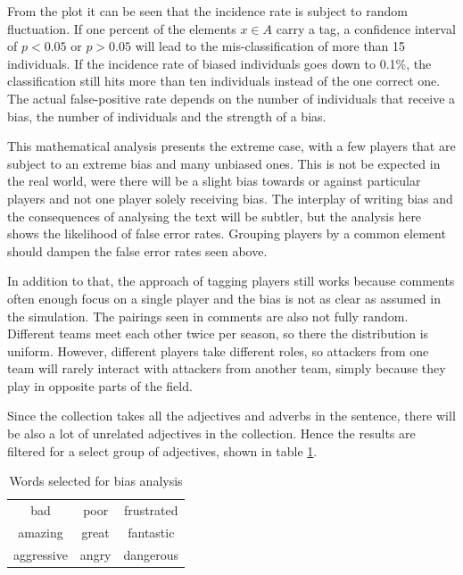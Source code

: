 \documentclass[10pt, a4paper]{UUThesisTemplate}
\begin{document}
From the plot it can be seen that the incidence rate is subject to random fluctuation. If one percent of the elements $x\in A$ carry a tag, a confidence interval of $p<0.05$ or $p>0.05$ will lead to the mis-classification of more than 15 individuals. If the incidence rate of biased individuals goes down to 0.1\%, the classification still hits more than ten individuals instead of the one correct one. The actual false-positive rate depends on the number of individuals that receive a bias, the number of individuals and the strength of a bias.

This mathematical analysis presents the extreme case, with a few players that are subject to an extreme bias and many unbiased ones. This is not be expected in the real world, were there will be a slight bias towards or against particular players and not one player solely receiving bias. The interplay of writing bias and the consequences of analysing the text will be subtler, but the analysis here shows the likelihood of false error rates. Grouping players by a common element should dampen the false error rates seen above.

In addition to that, the approach of tagging players still works because comments often enough focus on a single player and the bias is not as clear as assumed in the simulation. The pairings seen in comments are also not fully random. Different teams meet each other twice per season, so there the distribution is uniform. However, different players take different roles, so attackers from one team will rarely interact with attackers from another team, simply because they play in opposite parts of the field.

Since the collection takes all the adjectives and adverbs in the sentence, there will be also a lot of unrelated adjectives in the collection. Hence the results are filtered for a select group of adjectives, shown in table \ref{tab:selectedwords}.

\begin{table}\centering
\begin{tabular}{c c c}
\hline
bad & poor & frustrated\\
amazing & great & fantastic\\
aggressive & angry & dangerous\\\hline
\end{tabular}
\caption{Words selected for bias analysis}\label{tab:selectedwords}\vspace{-0.5cm}
\end{table}
\end{document}

